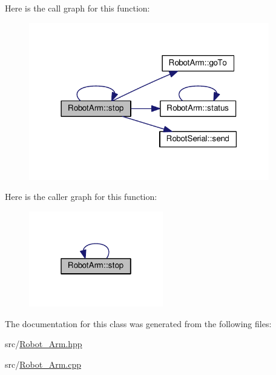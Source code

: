 Here is the call graph for this function\+:\nopagebreak
\begin{figure}[H]
\begin{center}
\leavevmode
\includegraphics[width=297pt]{class_robot_arm_a645e7400a9e29525385d07e0b9552eb4_cgraph}
\end{center}
\end{figure}




Here is the caller graph for this function\+:\nopagebreak
\begin{figure}[H]
\begin{center}
\leavevmode
\includegraphics[width=166pt]{class_robot_arm_a645e7400a9e29525385d07e0b9552eb4_icgraph}
\end{center}
\end{figure}




The documentation for this class was generated from the following files\+:\begin{DoxyCompactItemize}
\item 
src/\hyperlink{_robot___arm_8hpp}{Robot\+\_\+\+Arm.\+hpp}\item 
src/\hyperlink{_robot___arm_8cpp}{Robot\+\_\+\+Arm.\+cpp}\end{DoxyCompactItemize}
